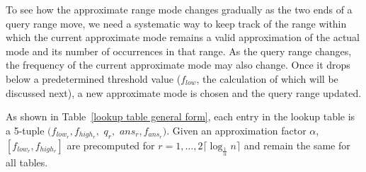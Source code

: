 \documentclass{llncs}
\begin{document}
To see how the approximate range mode changes gradually as
the two ends of a query range move, we need a systematic way 
to keep track of the range within 
which the current approximate mode remains a valid approximation of 
the actual mode and its number of occurrences in that range. As the query range 
changes, the frequency of the current approximate mode may also
change. Once it drops below a predetermined threshold value
($f_{low}$, the calculation of which will be discussed next), 
a new approximate mode is chosen and the query range updated. 

As shown in Table~\ref{lookup table general form}, each entry in 
the lookup table is a 5-tuple $(f_{low_r},
f_{high_r},$ \linebreak[2] $q_r,$ 
\linebreak[2]$ans_r, f_{ans_r})$. 
Given an approximation factor $\alpha$, $[f_{low_r}, f_{high_r}]$ are precomputed 
for $r=1,\ldots,2\lceil \log_{\frac{1}{\alpha}} n \rceil$  and
remain the same for all tables.\\
\end{document}
